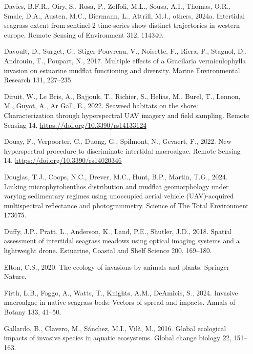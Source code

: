 \documentclass[
  letterpaper,
  DIV=11,
  numbers=noendperiod]{scrartcl}
\newlength{\cslhangindent}
\newenvironment{CSLReferences}[2] %
 {\begin{list}{}{%
  \setlength{\itemindent}{0pt}
  \setlength{\leftmargin}{0pt}
  \setlength{\parsep}{0pt}
  \ifodd #1
   \setlength{\leftmargin}{\cslhangindent}
   \setlength{\itemindent}{-1\cslhangindent}
  \fi
  \setlength{\itemsep}{#2\baselineskip}}}
 {\end{list}}
\begin{document}
\begin{CSLReferences}{1}{0}
Davies, B.F.R., Oiry, S., Rosa, P., Zoffoli, M.L., Sousa, A.I., Thomas,
O.R., Smale, D.A., Austen, M.C., Biermann, L., Attrill, M.J., others,
2024a. Intertidal seagrass extent from sentinel-2 time-series show
distinct trajectories in western europe. Remote Sensing of Environment
312, 114340.

Davoult, D., Surget, G., Stiger-Pouvreau, V., Noisette, F., Riera, P.,
Stagnol, D., Androuin, T., Poupart, N., 2017. Multiple effects of a
{G}racilaria vermiculophylla invasion on estuarine mudflat functioning
and diversity. Marine Environmental Research 131, 227--235.

Diruit, W., Le Bris, A., Bajjouk, T., Richier, S., Helias, M., Burel,
T., Lennon, M., Guyot, A., Ar Gall, E., 2022. Seaweed habitats on the
shore: Characterization through hyperspectral UAV imagery and field
sampling. Remote Sensing 14. \url{https://doi.org/10.3390/rs14133124}

Douay, F., Verpoorter, C., Duong, G., Spilmont, N., Gevaert, F., 2022.
New hyperspectral procedure to discriminate intertidal macroalgae.
Remote Sensing 14. \url{https://doi.org/10.3390/rs14020346}

Douglas, T.J., Coops, N.C., Drever, M.C., Hunt, B.P., Martin, T.G.,
2024. Linking microphytobenthos distribution and mudflat geomorphology
under varying sedimentary regimes using unoccupied aerial vehicle
(UAV)-acquired multispectral reflectance and photogrammetry. Science of
The Total Environment 173675.

Duffy, J.P., Pratt, L., Anderson, K., Land, P.E., Shutler, J.D., 2018.
Spatial assessment of intertidal seagrass meadows using optical imaging
systems and a lightweight drone. Estuarine, Coastal and Shelf Science
200, 169--180.

Elton, C.S., 2020. The ecology of invasions by animals and plants.
Springer Nature.

Firth, L.B., Foggo, A., Watts, T., Knights, A.M., DeAmicis, S., 2024.
Invasive macroalgae in native seagrass beds: Vectors of spread and
impacts. Annals of Botany 133, 41--50.

Gallardo, B., Clavero, M., Sánchez, M.I., Vilà, M., 2016. Global
ecological impacts of invasive species in aquatic ecosystems. Global
change biology 22, 151--163.


\end{CSLReferences}
\end{document}
